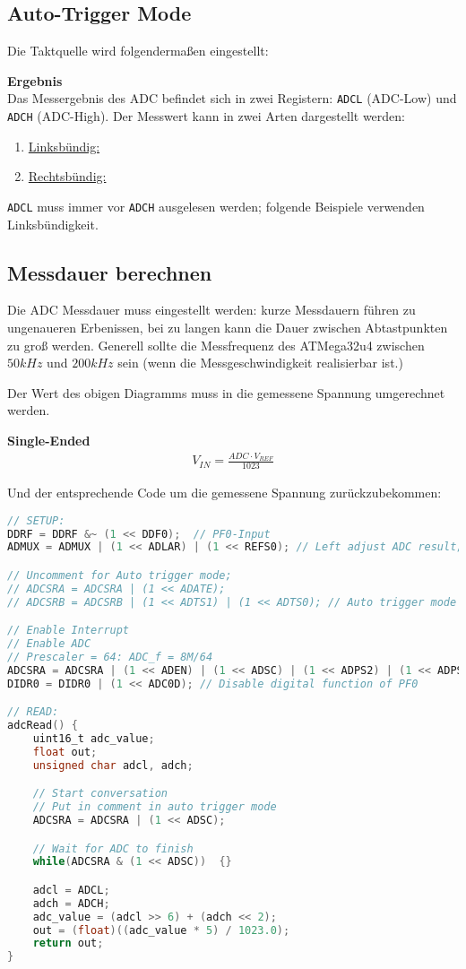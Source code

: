 \subsection{Auto-Trigger Mode} \label{Atmega/AutoTrigger}
Die Taktquelle wird folgendermaßen eingestellt:

\textbf{Ergebnis} \\
Das Messergebnis des ADC befindet sich in zwei Registern: \verb|ADCL| (ADC-Low) und \verb|ADCH| (ADC-High). Der Messwert kann in zwei Arten dargestellt werden:
\begin{enumerate}
    \item \underline{Linksbündig:}
    \item \underline{Rechtsbündig:}
\end{enumerate}

\verb|ADCL| muss immer vor \verb|ADCH| ausgelesen werden; folgende Beispiele verwenden Linksbündigkeit.\\

\subsection{Messdauer berechnen}
Die ADC Messdauer muss eingestellt werden: kurze Messdauern führen zu ungenaueren Erbenissen, bei zu langen kann die Dauer zwischen Abtastpunkten zu groß werden. Generell sollte die Messfrequenz des ATMega32u4 zwischen $50kHz$ und $200kHz$ sein (wenn die Messgeschwindigkeit realisierbar ist.)


Der Wert des obigen Diagramms muss in die gemessene Spannung umgerechnet werden.

\textbf{Single-Ended}
\begin{align}
    V_{IN} = \frac{ADC \cdot V_{REF}}{1023}
\end{align}

Und der entsprechende Code um die gemessene Spannung zurückzubekommen:
\begin{lstlisting}[language=C]
// SETUP:
DDRF = DDRF &~ (1 << DDF0);	 // PF0-Input
ADMUX = ADMUX | (1 << ADLAR) | (1 << REFS0); // Left adjust ADC result; Voltage reference

// Uncomment for Auto trigger mode; 
// ADCSRA = ADCSRA | (1 << ADATE);
// ADCSRB = ADCSRB | (1 << ADTS1) | (1 << ADTS0); // Auto trigger mode Taktquelle (Timer0)

// Enable Interrupt
// Enable ADC
// Prescaler = 64: ADC_f = 8M/64
ADCSRA = ADCSRA | (1 << ADEN) | (1 << ADSC) | (1 << ADPS2) | (1 << ADPS1);
DIDR0 = DIDR0 | (1 << ADC0D); // Disable digital function of PF0

// READ:
adcRead() {
    uint16_t adc_value;
    float out;
    unsigned char adcl, adch;

    // Start conversation
    // Put in comment in auto trigger mode
    ADCSRA = ADCSRA | (1 << ADSC);

    // Wait for ADC to finish
    while(ADCSRA & (1 << ADSC))  {}

    adcl = ADCL;
    adch = ADCH;
    adc_value = (adcl >> 6) + (adch << 2);
    out = (float)((adc_value * 5) / 1023.0);
    return out;
}
\end{lstlisting}

